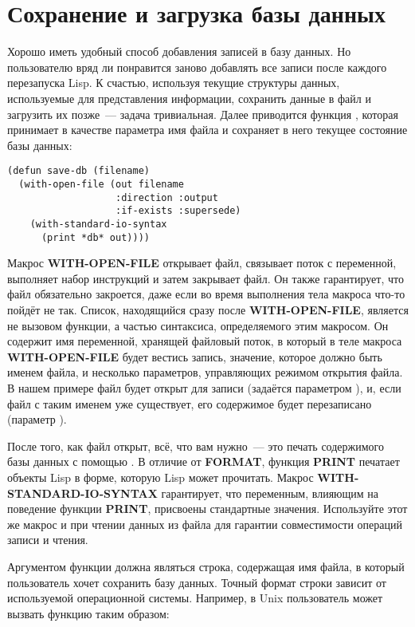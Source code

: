 \section{Сохранение и загрузка базы данных}

Хорошо иметь удобный способ добавления записей в базу данных. Но пользователю вряд ли
понравится заново добавлять все записи после каждого перезапуска Lisp. К счастью,
используя текущие структуры данных, используемые для представления информации, сохранить
данные в файл и загрузить их позже~--- задача тривиальная. Далее приводится функция
, которая принимает в качестве параметра имя файла и сохраняет в него
текущее состояние базы данных:

\begin{lstlisting}
(defun save-db (filename)
  (with-open-file (out filename
                   :direction :output
                   :if-exists :supersede)
    (with-standard-io-syntax
      (print *db* out))))
\end{lstlisting}

Макрос \textbf{WITH-OPEN-FILE} открывает файл, связывает поток с переменной, выполняет
набор инструкций и затем закрывает файл. Он также гарантирует, что файл обязательно
закроется, даже если во время выполнения тела макроса что-то пойдёт не так. Список,
находящийся сразу после \textbf{WITH-OPEN-FILE}, является не вызовом функции, а частью
синтаксиса, определяемого этим макросом. Он содержит имя переменной, хранящей файловый
поток, в который в теле макроса \textbf{WITH-OPEN-FILE} будет вестись запись, значение,
которое должно быть именем файла, и несколько параметров, управляющих режимом открытия
файла. В нашем примере файл будет открыт для записи (задаётся параметром 
), и, если файл с таким именем уже существует, его содержимое будет
перезаписано (параметр  ).

После того, как файл открыт, всё, что вам нужно~--- это печать содержимого базы данных с
помощью . В отличие от \textbf{FORMAT}, функция \textbf{PRINT}
печатает объекты Lisp в форме, которую Lisp может прочитать. Макрос
\textbf{WITH-STANDARD-IO-SYNTAX} гарантирует, что переменным, влияющим на поведение
функции \textbf{PRINT}, присвоены стандартные значения. Используйте этот же макрос и при
чтении данных из файла для гарантии совместимости операций записи и чтения.

Аргументом функции  должна являться строка, содержащая имя файла, в который
пользователь хочет сохранить базу данных. Точный формат строки зависит от используемой
операционной системы. Например, в Unix пользователь может вызвать функцию 
таким образом:

